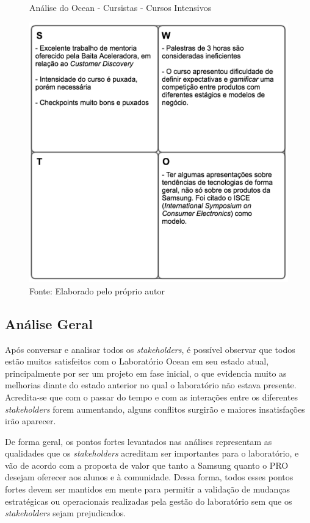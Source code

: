 \begin{figure}[H]
\caption{Análise do Ocean - Cursistas - Cursos Intensivos}
\centerline{\includegraphics[scale=0.75]{img/cursosintensivosswot}}
\label{fig:swotcursistasintensivos}
\caption* {Fonte: Elaborado pelo próprio autor}
\end{figure}

\subsection{Análise Geral}

Após conversar e analisar todos os \textit{stakeholders}, é possível observar que todos estão muitos satisfeitos com o Laboratório Ocean em seu estado atual, principalmente por ser um projeto em fase inicial, o que evidencia muito as melhorias diante do estado anterior no qual o laboratório não estava presente. Acredita-se que com o passar do tempo e com as interações entre os diferentes \textit{stakeholders} forem aumentando, alguns conflitos surgirão e maiores insatisfações irão aparecer.

De forma geral, os pontos fortes levantados nas análises representam as qualidades que os \textit{stakeholders} acreditam ser importantes para o laboratório, e vão de acordo com a proposta de valor que tanto a Samsung quanto o PRO desejam oferecer aos alunos e à comunidade. Dessa forma, todos esses pontos fortes devem ser mantidos em mente para permitir a validação de mudanças estratégicas ou operacionais realizadas pela gestão do laboratório sem que os \textit{stakeholders} sejam prejudicados.

